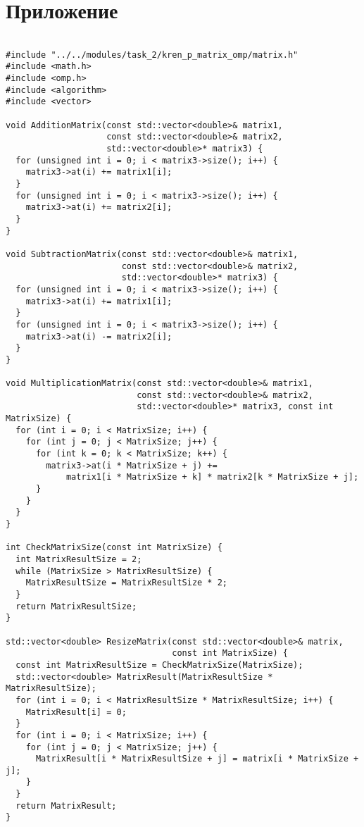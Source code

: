 \documentclass{report}
\begin{document}
\section*{Приложение}
\begin{lstlisting}

#include "../../modules/task_2/kren_p_matrix_omp/matrix.h"
#include <math.h>
#include <omp.h>
#include <algorithm>
#include <vector>

void AdditionMatrix(const std::vector<double>& matrix1,
                    const std::vector<double>& matrix2,
                    std::vector<double>* matrix3) {
  for (unsigned int i = 0; i < matrix3->size(); i++) {
    matrix3->at(i) += matrix1[i];
  }
  for (unsigned int i = 0; i < matrix3->size(); i++) {
    matrix3->at(i) += matrix2[i];
  }
}

void SubtractionMatrix(const std::vector<double>& matrix1,
                       const std::vector<double>& matrix2,
                       std::vector<double>* matrix3) {
  for (unsigned int i = 0; i < matrix3->size(); i++) {
    matrix3->at(i) += matrix1[i];
  }
  for (unsigned int i = 0; i < matrix3->size(); i++) {
    matrix3->at(i) -= matrix2[i];
  }
}

void MultiplicationMatrix(const std::vector<double>& matrix1,
                          const std::vector<double>& matrix2,
                          std::vector<double>* matrix3, const int MatrixSize) {
  for (int i = 0; i < MatrixSize; i++) {
    for (int j = 0; j < MatrixSize; j++) {
      for (int k = 0; k < MatrixSize; k++) {
        matrix3->at(i * MatrixSize + j) +=
            matrix1[i * MatrixSize + k] * matrix2[k * MatrixSize + j];
      }
    }
  }
}

int CheckMatrixSize(const int MatrixSize) {
  int MatrixResultSize = 2;
  while (MatrixSize > MatrixResultSize) {
    MatrixResultSize = MatrixResultSize * 2;
  }
  return MatrixResultSize;
}

std::vector<double> ResizeMatrix(const std::vector<double>& matrix,
                                 const int MatrixSize) {
  const int MatrixResultSize = CheckMatrixSize(MatrixSize);
  std::vector<double> MatrixResult(MatrixResultSize * MatrixResultSize);
  for (int i = 0; i < MatrixResultSize * MatrixResultSize; i++) {
    MatrixResult[i] = 0;
  }
  for (int i = 0; i < MatrixSize; i++) {
    for (int j = 0; j < MatrixSize; j++) {
      MatrixResult[i * MatrixResultSize + j] = matrix[i * MatrixSize + j];
    }
  }
  return MatrixResult;
}


\end{lstlisting}
\end{document}
